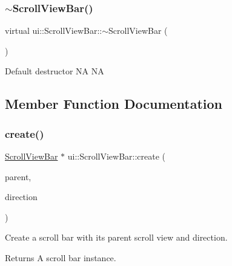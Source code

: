 \subsubsection{\texorpdfstring{$\sim$\+Scroll\+View\+Bar()}{~ScrollViewBar()}\hspace{0.1cm}{\footnotesize\ttfamily [2/2]}}
{\footnotesize\ttfamily virtual ui\+::\+Scroll\+View\+Bar\+::$\sim$\+Scroll\+View\+Bar (\begin{DoxyParamCaption}{ }\end{DoxyParamCaption})\hspace{0.3cm}{\ttfamily [virtual]}}

Default destructor  NA  NA 

\subsection{Member Function Documentation}
\mbox{\label{classui_1_1ScrollViewBar_aabaeb14d832b49de79ab721170a284ff}} 
\subsubsection{\texorpdfstring{create()}{create()}\hspace{0.1cm}{\footnotesize\ttfamily [1/2]}}
{\footnotesize\ttfamily \hyperlink{classui_1_1ScrollViewBar}{Scroll\+View\+Bar} $\ast$ ui\+::\+Scroll\+View\+Bar\+::create (\begin{DoxyParamCaption}\item[{\hyperlink{classui_1_1ScrollView}{Scroll\+View} $\ast$}]{parent,  }\item[{\hyperlink{classui_1_1ScrollView_aed2d778ae8098dcafe323b2beae8dd6b}{Scroll\+View\+::\+Direction}}]{direction }\end{DoxyParamCaption})\hspace{0.3cm}{\ttfamily [static]}}

Create a scroll bar with its parent scroll view and direction. \begin{DoxyReturn}{Returns}
A scroll bar instance. 
\end{DoxyReturn}
\mbox{\label{classui_1_1ScrollViewBar_abe22494ea700072a47abad89675ce319}} 
